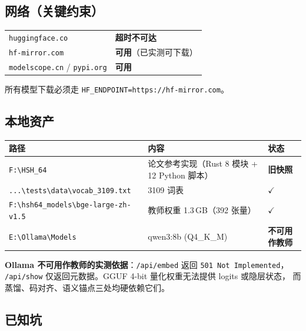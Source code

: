 \documentclass[11pt,a4paper]{ctexart}
\newcommand{\warn}[1]{\textcolor{warnred}{\textbf{#1}}}
\newcommand{\ok}[1]{\textcolor{okgreen}{\textbf{#1}}}
\theoremstyle{definition}
\begin{document}
\subsection{网络（关键约束）}

\begin{center}
\begin{tabularx}{\textwidth}{@{}lX@{}}
\toprule
\texttt{huggingface.co} & \warn{超时不可达} \\
\texttt{hf-mirror.com} & \ok{可用}（已实测可下载） \\
\texttt{modelscope.cn} / \texttt{pypi.org} & \ok{可用} \\
\bottomrule
\end{tabularx}
\end{center}

所有模型下载必须走 \texttt{HF\_ENDPOINT=https://hf-mirror.com}。

\subsection{本地资产}

\begin{center}
\begin{tabularx}{\textwidth}{@{}lXl@{}}
\toprule
\textbf{路径} & \textbf{内容} & \textbf{状态} \\
\midrule
\texttt{F:\textbackslash HSH\_64} & 论文参考实现（Rust 8 模块 + 12 Python 脚本） & \warn{旧快照} \\
\texttt{...\textbackslash tests\textbackslash data\textbackslash vocab\_3109.txt} & 3109 词表 & \ok{$\checkmark$} \\
\texttt{F:\textbackslash hsh64\_models\textbackslash bge-large-zh-v1.5} & 教师权重 1.3\,GB（392 张量） & \ok{$\checkmark$} \\
\texttt{E:\textbackslash Ollama\textbackslash Models} & qwen3:8b (Q4\_K\_M) & \warn{不可用作教师} \\
\bottomrule
\end{tabularx}
\end{center}

\warn{Ollama 不可用作教师的实测依据}：\texttt{/api/embed} 返回 \texttt{501 Not Implemented}，
\texttt{/api/show} 仅返回元数据。GGUF 4-bit 量化权重无法提供 logits 或隐层状态，
而蒸馏、码对齐、语义锚点三处均硬依赖它们。

\subsection{已知坑}
\end{document}
